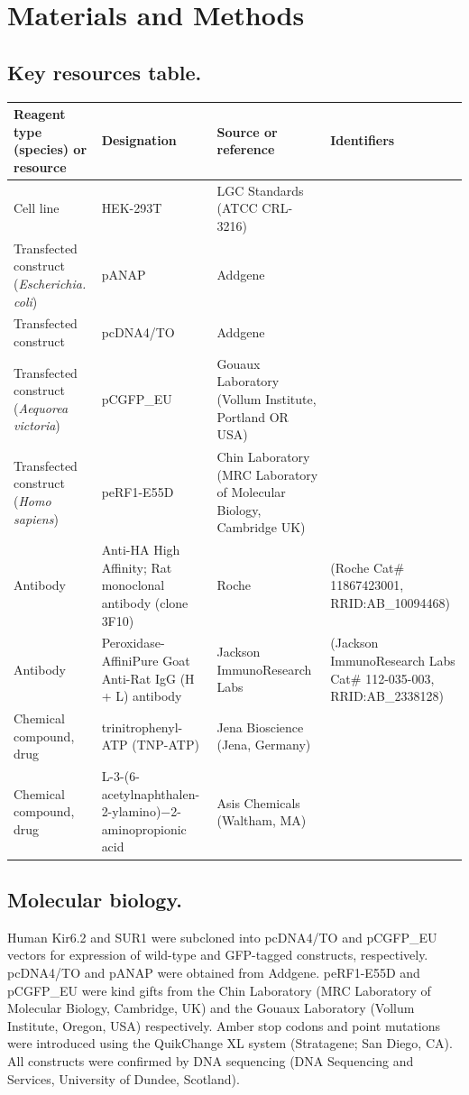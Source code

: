 \documentclass[9pt,lineno, onehalfspacing]{elife_modified}
\begin{document}
\section{Materials and Methods}

\subsection{Key resources table.}
\begin{tabular}{p{35mm} | p{30mm} | p{30mm} | p{30mm}}
\toprule
Reagent type (species) or resource & Designation & Source or reference & Identifiers \\
\midrule
Cell line & HEK-293T & LGC Standards (ATCC CRL-3216) & \\
Transfected construct (\textit{Escherichia. coli}) & pANAP & Addgene & \\
Transfected construct & pcDNA4/TO & Addgene & \\
Transfected construct (\textit{Aequorea victoria}) & pCGFP\_EU & Gouaux Laboratory (Vollum Institute, Portland OR USA) & \\
Transfected construct (\textit{Homo sapiens}) & peRF1-E55D & Chin Laboratory (MRC Laboratory of Molecular Biology, Cambridge UK) & \\
Antibody & Anti-HA High Affinity; Rat monoclonal antibody (clone 3F10) & Roche & (Roche Cat\# 11867423001, RRID:AB\_10094468) \\
Antibody & Peroxidase-AffiniPure Goat Anti-Rat IgG (H + L) antibody & Jackson ImmunoResearch Labs & (Jackson ImmunoResearch Labs Cat\# 112-035-003, RRID:AB\_2338128) \\
Chemical compound, drug & trinitrophenyl-ATP (TNP-ATP) & Jena Bioscience (Jena, Germany) & \\
Chemical compound, drug & L-3-(6-acetylnaphthalen-2-ylamino)−2-aminopropionic acid & Asis Chemicals (Waltham, MA) & \\
\midrule
\end{tabular}

\subsection{Molecular biology.}
Human Kir6.2 and SUR1 were subcloned into pcDNA4/TO and pCGFP\_EU vectors for expression of wild-type and GFP-tagged constructs, respectively.
pcDNA4/TO and pANAP were obtained from Addgene.
peRF1-E55D and pCGFP\_EU were kind gifts from the Chin Laboratory (MRC Laboratory of Molecular Biology, Cambridge, UK) and the Gouaux Laboratory (Vollum Institute, Oregon, USA) respectively.
Amber stop codons and point mutations were introduced using the QuikChange XL system (Stratagene; San Diego, CA).
All constructs were confirmed by DNA sequencing (DNA Sequencing and Services, University of Dundee, Scotland).
\end{document}

